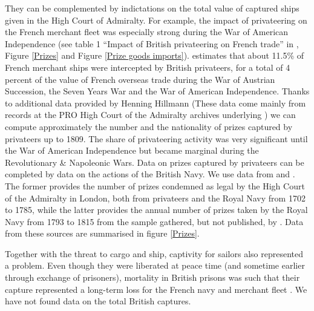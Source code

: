 \documentclass[12pt,a4paper,notitlepage,english]{article}
\begin{document}
They can be complemented by indictations on the total value of captured ships given in the High Court of Admiralty. For example, the impact of privateering on the French merchant fleet was especially strong during the War of American Independence (see table 1 ``Impact of British privateering on French trade'' in \cite{Hillmann2011}, Figure \ref{Prizes} and Figure \ref{Prize goods imports}).
\cite{Hillmann2011} estimates that about 11.5\% of French merchant ships were intercepted by British privateers, for a total of 4 percent of the value of French overseas trade during the War of Austrian Succession, the Seven Years War and the War of American Independence.
Thanks to additional data provided by Henning Hillmann (These data come mainly from records at the PRO High Court of the Admiralty archives underlying \cite{Hillmann2011}) we can compute approximately the number and the nationality of prizes captured by privateers up to 1809.
The share of privateering activity was very significant until the War of American Independence but became marginal during the Revolutionary \& Napoleonic Wars.
Data on prizes captured by privateers can be completed by data on the actions of the British Navy.
We use data from \cite{Starkey1990} and \cite{Benjamin2009}. 
The former provides the number of prizes condemned as legal by the High Court of the Admiralty in London, both from privateers and the Royal Navy from 1702 to 1785, while the latter provides the annual number of prizes taken by the Royal Navy from 1793 to 1815 from the sample gathered, but not published, by \cite{Hill1998}.
Data from these sources are summarised in figure \ref{Prizes}.




Together with the threat to cargo and ship, captivity for sailors also represented a problem. Even though they were liberated at peace time (and sometime earlier through exchange of prisoners), mortality in British prisons was such that their capture represented a long-term loss for the French navy and merchant fleet \citep{LeGoff1998}. We have not found data on the total British captures.

\end{document}

